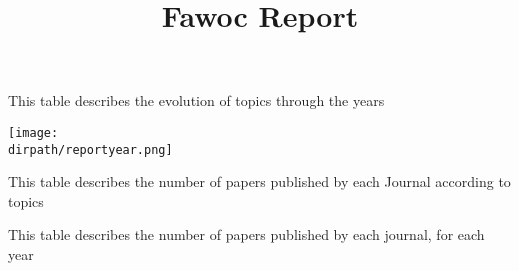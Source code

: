 \documentclass{article}
\newcommand*{\dirpath}{./report2021-06-15-11-27-00.946286}%
\begin{document}
	\title{Fawoc Report}
	\maketitle
	\begin{table}[h]
		\centering
		
		\caption{This table describes the evolution of topics through the years}
	\end{table}
	
	
	\texttt{[image: \\dirpath/reportyear.png]}
	

	\begin{table} 
		\centering
		
		\caption{This table describes the number of papers published by each Journal according to topics}
	\end{table}


	\begin{table}
		\centering
		
		\caption{This table describes the number of papers published by each journal, for each year}
	\end{table}
\end{document}
